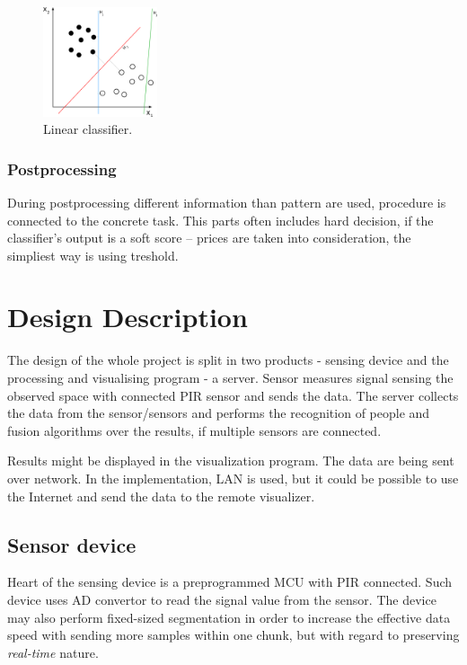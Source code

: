 \begin{figure}[h!]
\begin{center}
\includegraphics[width=0.3\textwidth]{img/linear.png}
\caption{Linear classifier.\cite{LinearClassifier}\label{fig:linearclassifier}}
\end{center}
\end{figure}

\subsection*{Postprocessing}
During postprocessing different information than pattern are used, procedure is
connected to the concrete task. This parts often includes hard decision, if the
classifier's output is a soft score -- prices are taken into consideration,
the simpliest way is using treshold.




\chapter{Design Description}

The design of the whole project is split in two products - sensing device
and the processing and visualising program - a server. Sensor measures signal
sensing the observed space with connected PIR sensor and sends the data. The server
collects the data from the sensor/sensors and performs the recognition of 
people and fusion algorithms over the results, if multiple sensors are connected.

Results might be displayed in the visualization program. The data are being sent
over network. In the implementation, LAN is used, but it could be possible to
use the Internet and send the data to the remote visualizer.


\section{Sensor device}

Heart of the sensing device is a preprogrammed MCU with PIR connected. Such device
uses AD convertor to read the signal value from the sensor. The device may also
perform fixed-sized segmentation in order to increase the effective data speed with
sending more samples within one chunk, but with regard to preserving {\it real-time}
nature.

